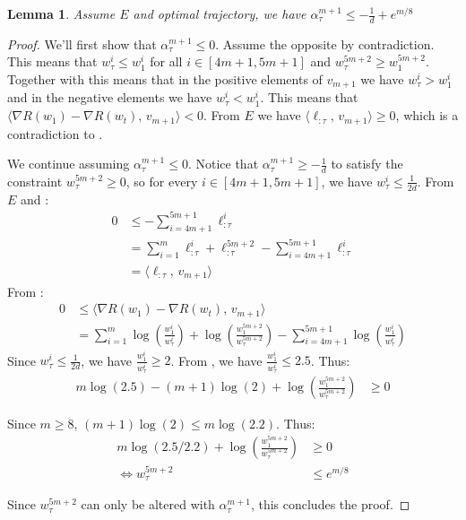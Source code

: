 \documentclass[10pt]{article}
\newtheorem{lemma}[theorem]{Lemma}
\theoremstyle{definition}
\theoremstyle{remark}
\newcommand\inprod[2]{\langle #1,\,#2 \rangle}
\newcommand{\roundy}[1]{ {\left( #1 \right)}}
\begin{document}
\begin{lemma} \label{lem:polytope stuck base}
Assume $E$ and optimal trajectory, we have $\alpha_\tau^{m+1} \le -\frac{1}{d} + e^{m/8}$
\end{lemma}
\begin{proof}
We'll first show that $\alpha_\tau^{m+1}\le 0$. Assume the opposite by contradiction. This means that $w_\tau^i \le w_1^i$ for all $i\in[4m+1,5m+1]$ and $w_\tau^{5m+2} \ge w_1^{5m+2}$. Together with  this means that in the positive elements of $v_{m+1}$ we have $w_\tau^i> w_1^i$ and in the negative elements we have $w_\tau^i< w_1^i$. This means that $\inprod{\nabla R(w_1) - \nabla R(w_t)}{v_{m+1}} < 0$. From $E$ we have $\inprod{\ell_{:\tau}}{v_{m+1}} \ge 0$, which is a contradiction to .

We continue assuming $\alpha_\tau^{m+1}\le 0$. Notice that $\alpha_\tau^{m+1} \ge -\frac{1}{d}$ to satisfy the constraint $w_\tau^{5m+2} \ge 0$, so for every $i\in[4m+1,5m+1]$, we have $w_\tau^i \le \frac{1}{2d}$. From $E$ and :
\begin{align*}
    0 &\le -\sum_{i=4m+1}^{5m+1}\ell_{:\tau}^i\\
    &= \sum_{i=1}^{m}\ell_{:\tau}^i + \ell_{:\tau}^{5m+2} - \sum_{i=4m+1}^{5m+1}\ell_{:\tau}^i\\
    &= \inprod{\ell_{:\tau}}{v_{m+1}}
\end{align*}
From :
\begin{align*}
    0 &\le \inprod{\nabla R(w_1) - \nabla R(w_t)}{v_{m+1}} \\
    &= \sum_{i=1}^m\log\roundy{\frac{w_1^i}{w_\tau^i}} + \log\roundy{\frac{w_1^{5m+2}}{w_\tau^{5m+2}}} - \sum_{i=4m+1}^{5m+1}\log\roundy{\frac{w_1^i}{w_\tau^i}}
\end{align*}
Since $w_\tau^i \le \frac{1}{2d}$, we have $\frac{w_1^i}{w_\tau^i} \ge 2$. From , we have $\frac{w_1^i}{w_\tau^i} \le 2.5$. Thus:
\begin{align*}
    m\log(2.5) - (m+1)\log(2) + \log\roundy{\frac{w_1^{5m+2}}{w_\tau^{5m+2}}} &\ge 0
\end{align*}

Since $m \ge 8$, $(m+1)\log(2) \le m\log(2.2)$. Thus:
\begin{align*}
    m\log(2.5/2.2) + \log\roundy{\frac{w_1^{5m+2}}{w_\tau^{5m+2}}} &\ge 0\\
    \Longleftrightarrow w_\tau^{5m+2} &\le e^{m/8}
\end{align*}

Since $w_\tau^{5m+2}$ can only be altered with $\alpha_\tau^{m+1}$, this concludes the proof.
\end{proof}
\end{document}
